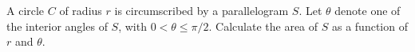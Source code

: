A circle $C$ of radius $r$ is circumscribed by a parallelogram $S$. Let
$\theta$ denote one of the interior angles of $S$, with $0 < \theta \le \pi/2$.
Calculate the area of $S$ as a function of $r$ and $\theta$.

